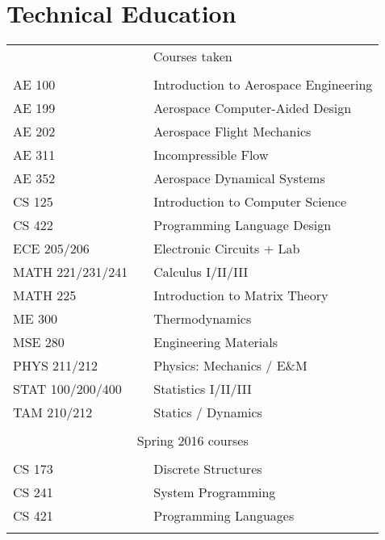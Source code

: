\documentclass[10pt,letterpaper,sans]{moderncv}
\begin{document}
\section{Technical Education}
\vspace{1em}
\begin{tabular}{l p{1in} l}
  \multicolumn{3}{c}{Courses taken} \\
  \\[3pt]
  AE 100           & \hfill & Introduction to Aerospace Engineering \\
  AE 199           & \hfill & Aerospace Computer-Aided Design       \\
  AE 202           & \hfill & Aerospace Flight Mechanics            \\
  AE 311           & \hfill & Incompressible Flow                   \\
  AE 352           & \hfill & Aerospace Dynamical Systems           \\
  CS 125           & \hfill & Introduction to Computer Science      \\
  CS 422           & \hfill & Programming Language Design           \\
  ECE 205/206      & \hfill & Electronic Circuits + Lab             \\
  MATH 221/231/241 & \hfill & Calculus I/II/III                     \\
  MATH 225         & \hfill & Introduction to Matrix Theory         \\
  ME 300           & \hfill & Thermodynamics                        \\
  MSE 280          & \hfill & Engineering Materials                 \\
  PHYS 211/212     & \hfill & Physics: Mechanics / E\&M             \\
  STAT 100/200/400 & \hfill & Statistics I/II/III                   \\
  TAM 210/212      & \hfill & Statics / Dynamics                    \\
  \\
  \multicolumn{3}{c}{Spring 2016 courses} \\
  \\[3pt]
  CS 173           & \hfill & Discrete Structures                   \\
  CS 241           & \hfill & System Programming                    \\
  CS 421           & \hfill & Programming Languages                 \\
  \\
\end{tabular}
\end{document}
